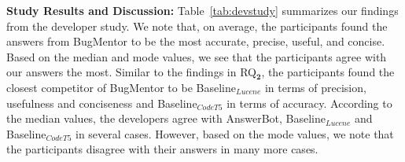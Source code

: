 \begin{table}[!ht]
\centering
\caption{Comparison of BugMentor with the Baseline Techniques using a Developer Study}
\label{tab:devstudy}
\renewcommand{\arraystretch}{1.2}
\end{table}

\textbf{Study Results and Discussion:} 
Table~\ref{tab:devstudy} summarizes our
findings from the developer study. We note that, on average, the participants found the answers from BugMentor to be the most accurate, precise, useful, and concise. Based on the median and mode values, we see that the participants 
agree with our answers the most.
Similar to the findings in RQ$\mathbf{_2}$, the participants found the closest competitor of BugMentor to be Baseline$_{Lucene}$ in terms of precision, usefulness and conciseness and Baseline$_{CodeT5}$ in terms of accuracy. According to the median values, the developers agree with AnswerBot, Baseline$_{Lucene}$ and Baseline$_{CodeT5}$ in several cases. However, based on the mode values, we note that the participants disagree with their answers in many more cases.

